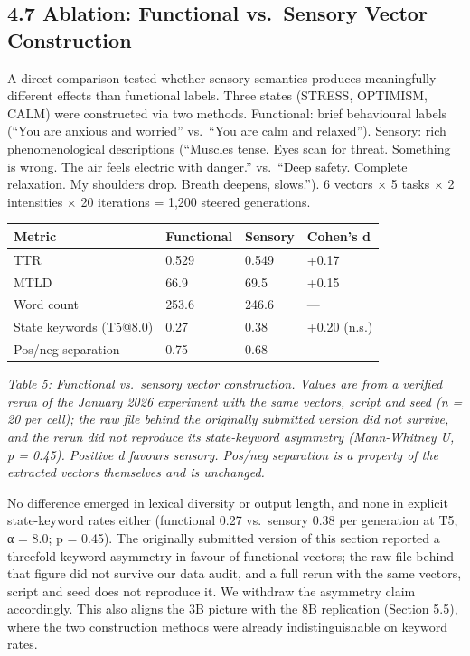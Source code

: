 \documentclass[11pt,a4paper]{article}
\begin{document}
\subsection*{4.7 Ablation: Functional vs.~Sensory Vector Construction}

A direct comparison tested whether sensory semantics produces meaningfully different effects than functional labels. Three states (STRESS, OPTIMISM, CALM) were constructed via two methods. Functional: brief behavioural labels (``You are anxious and worried'' vs.~``You are calm and relaxed''). Sensory: rich phenomenological descriptions (``Muscles tense. Eyes scan for threat. Something is wrong. The air feels electric with danger.'' vs.~``Deep safety. Complete relaxation. My shoulders drop. Breath deepens, slows.''). 6 vectors × 5 tasks × 2 intensities × 20 iterations = 1,200 steered generations.

\begin{longtable}[]{@{}llll@{}}
\toprule\noalign{}
Metric & Functional & Sensory & Cohen's d \\
\midrule\noalign{}
\endhead
\bottomrule\noalign{}
\endlastfoot
TTR & 0.529 & 0.549 & +0.17 \\
MTLD & 66.9 & 69.5 & +0.15 \\
Word count & 253.6 & 246.6 & --- \\
State keywords (T5@8.0) & 0.27 & 0.38 & +0.20 (n.s.) \\
Pos/neg separation & 0.75 & 0.68 & --- \\
\end{longtable}

\emph{Table 5: Functional vs.~sensory vector construction. Values are from a verified rerun of the January 2026 experiment with the same vectors, script and seed (n = 20 per cell); the raw file behind the originally submitted version did not survive, and the rerun did not reproduce its state-keyword asymmetry (Mann-Whitney U, p = 0.45). Positive d favours sensory. Pos/neg separation is a property of the extracted vectors themselves and is unchanged.}

No difference emerged in lexical diversity or output length, and none in explicit state-keyword rates either (functional 0.27 vs.~sensory 0.38 per generation at T5, α = 8.0; p = 0.45). The originally submitted version of this section reported a threefold keyword asymmetry in favour of functional vectors; the raw file behind that figure did not survive our data audit, and a full rerun with the same vectors, script and seed does not reproduce it. We withdraw the asymmetry claim accordingly. This also aligns the 3B picture with the 8B replication (Section 5.5), where the two construction methods were already indistinguishable on keyword rates.
\end{document}
